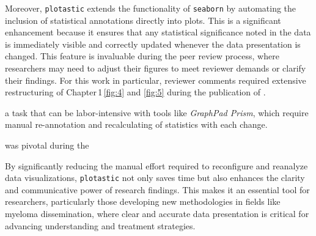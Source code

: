 Moreover, \texttt{plotastic} extends the functionality of \texttt{seaborn} by
automating the inclusion of statistical annotations directly into plots. This is
a significant enhancement because it ensures that any statistical significance
noted in the data is immediately visible and correctly updated whenever the data
presentation is changed. This feature is invaluable during the peer review
process, where researchers may need to adjust their figures to meet reviewer
demands or clarify their findings. For this work in particular, reviewer comments
required extensive restructuring of Chapter\,1\,\autoref{fig:4} and \ref{fig:5}
during the publication of \citet{kuricModelingMyelomaDissemination2024}.

a task that can be labor-intensive with tools
like \textit{GraphPad Prism}, which require manual re-annotation and recalculating of
statistics with each change.

was pivotal during the


By significantly reducing the manual effort required to reconfigure and
reanalyze data visualizations, \texttt{plotastic} not only saves time but also
enhances the clarity and communicative power of research findings. This makes it
an essential tool for researchers, particularly those developing new
methodologies in fields like myeloma dissemination, where clear and accurate
data presentation is critical for advancing understanding and treatment
strategies.






